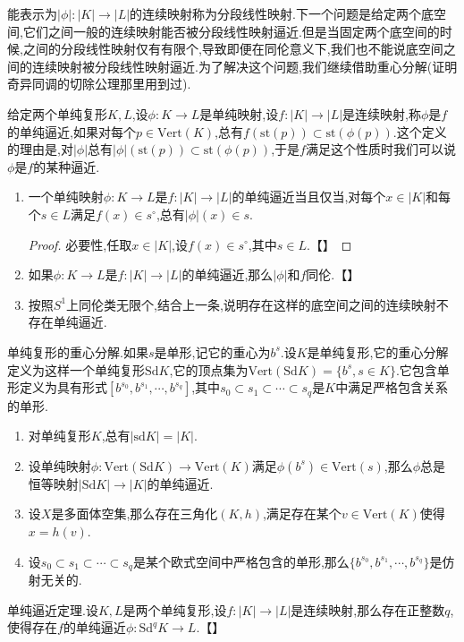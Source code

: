 能表示为$|\phi|:|K|\to|L|$的连续映射称为分段线性映射.下一个问题是给定两个底空间,它们之间一般的连续映射能否被分段线性映射逼近.但是当固定两个底空间的时候,之间的分段线性映射仅有有限个,导致即便在同伦意义下,我们也不能说底空间之间的连续映射被分段线性映射逼近.为了解决这个问题,我们继续借助重心分解(证明奇异同调的切除公理那里用到过).

给定两个单纯复形$K,L$,设$\phi:K\to L$是单纯映射,设$f:|K|\to|L|$是连续映射,称$\phi$是$f$的单纯逼近,如果对每个$p\in\mathrm{Vert}(K)$,总有$f(\mathrm{st}(p))\subset\mathrm{st}(\phi(p))$.这个定义的理由是,对$|\phi|$总有$|\phi|(\mathrm{st}(p))\subset\mathrm{st}(\phi(p))$,于是$f$满足这个性质时我们可以说$\phi$是$f$的某种逼近.
\begin{enumerate}
	\item 一个单纯映射$\phi:K\to L$是$f:|K|\to|L|$的单纯逼近当且仅当,对每个$x\in|K|$和每个$s\in L$满足$f(x)\in s^{\circ}$,总有$|\phi|(x)\in s$.
	\begin{proof}
		
		必要性,任取$x\in|K|$,设$f(x)\in s^{\circ}$,其中$s\in L$.【】
	\end{proof}
    \item 如果$\phi:K\to L$是$f:|K|\to|L|$的单纯逼近,那么$|\phi|$和$f$同伦.【】
    \item 按照$S^1$上同伦类无限个,结合上一条,说明存在这样的底空间之间的连续映射不存在单纯逼近.
\end{enumerate}

单纯复形的重心分解.如果$s$是单形,记它的重心为$b^s$.设$K$是单纯复形,它的重心分解定义为这样一个单纯复形$\mathrm{Sd}K$,它的顶点集为$\mathrm{Vert}(\mathrm{Sd}K)=\{b^s,s\in K\}$.它包含单形定义为具有形式$[b^{s_0},b^{s_1},\cdots,b^{s_q}]$,其中$s_0\subset s_1\subset\cdots\subset s_q$是$K$中满足严格包含关系的单形.
\begin{enumerate}
	\item 对单纯复形$K$,总有$|\mathrm{sd}K|=|K|$.
	\item 设单纯映射$\phi:\mathrm{Vert}(\mathrm{Sd}K)\to\mathrm{Vert}(K)$满足$\phi(b^s)\in\mathrm{Vert}(s)$,那么$\phi$总是恒等映射$|\mathrm{Sd}K|\to|K|$的单纯逼近.
	\item 设$X$是多面体空集,那么存在三角化$(K,h)$,满足存在某个$v\in\mathrm{Vert}(K)$使得$x=h(v)$.
	\item 设$s_0\subset s_1\subset\cdots\subset s_q$是某个欧式空间中严格包含的单形,那么$\{b^{s_0},b^{s_1},\cdots,b^{s_q}\}$是仿射无关的.
\end{enumerate}

单纯逼近定理.设$K,L$是两个单纯复形,设$f:|K|\to|L|$是连续映射,那么存在正整数$q$,使得存在$f$的单纯逼近$\phi:\mathrm{Sd}^qK\to L$.【】

